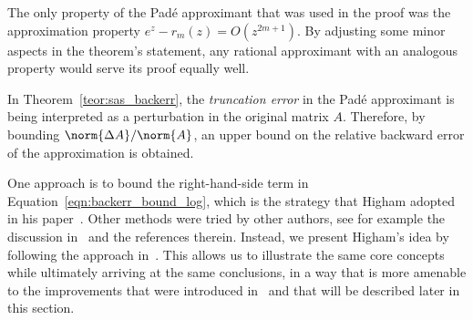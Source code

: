 \begin{oss*}
	The only property of the Padé approximant that was used in the proof was the approximation property $e^{z}-r_m(z)=O(z^{2m+1})$. 	
	By adjusting some minor aspects in the theorem's statement, any rational approximant with an analogous property would serve its proof equally well.
\end{oss*}

In Theorem~\ref{teor:sas_backerr}, the \emph{truncation error} in the Padé approximant is being interpreted as a perturbation in the original matrix $A$. Therefore, by bounding $\norm{\Delta{A}}/\norm{A}$, an upper bound on the relative backward error of the approximation is obtained.

One approach is to bound the right-hand-side term in Equation~\eqref{eqn:backerr_bound_log}, which is the strategy that Higham adopted in his paper~\cite{higham:SaS_revisited}. Other methods were tried by other authors, see for example the discussion in~\cite[§~10.3]{higham:matfun_book} and the references therein. Instead, we present Higham's idea by following the approach in~\cite{higham:alhi09_new}. This allows us to illustrate the same core concepts while ultimately arriving at the same conclusions, in a way that is more amenable to the improvements that were introduced in~\cite{higham:alhi09_new} and that will be described later in this section.

